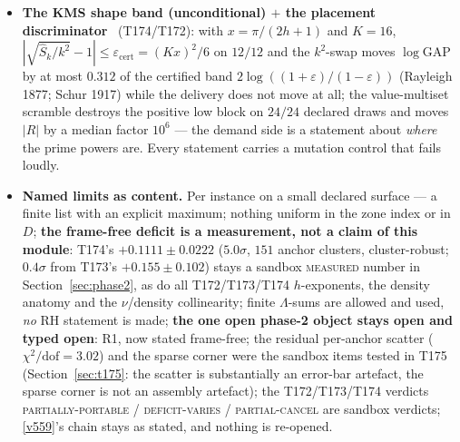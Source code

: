 \documentclass[11pt,a4paper]{article}
\begin{document}
\begin{itemize}[leftmargin=1.5em]
under the full positive diagonal group while a non-scalar diagonal moves the demand by
$0.23$--$1.40$ (the asymmetry is the anatomy); and the additive limit: neither the arch
term nor the comb term alone has a positive definite low block on a single cell ($0/12$
$+$ $0/12$ against $12/12$ for the sum) --- no factorisation $\hat A=(\mathrm{frame})
\times(\mathrm{arithmetic})$ exists, so T173's P6 is \emph{not} promoted to a theorem:
only its multiplicative half is.
\item \textbf{The KMS shape band (unconditional) $+$ the placement discriminator} \mE\
(T174/T172): with $x=\pi/(2h+1)$ and $K=16$,
$|\sqrt{\hat S_k/k^2}-1|\le\varepsilon_{\mathrm{cert}}=(Kx)^2/6$ on $12/12$ and the
$k^2$-swap moves $\log\mathrm{GAP}$ by at most $0.312$ of the certified band
$2\log((1+\varepsilon)/(1-\varepsilon))$ (Rayleigh 1877; Schur 1917) while the delivery
does not move at all; the value-multiset scramble destroys the positive low block on
$24/24$ declared draws and moves $|R|$ by a median factor $10^{6}$ --- the demand side is
a statement about \emph{where} the prime powers are. Every statement carries a mutation
control that fails loudly.
\item \textbf{Named limits as content.} Per instance on a small declared surface --- a
finite list with an explicit maximum; nothing uniform in the zone index or in $D$;
\textbf{the frame-free deficit is a measurement, not a claim of this module}: T174's
$+0.1111\pm0.0222$ ($5.0\sigma$, $151$ anchor clusters, cluster-robust; $0.4\sigma$ from
T173's $+0.155\pm0.102$) stays a sandbox \textsc{measured} number in
Section~\ref{sec:phase2}, as do all T172/T173/T174 $h$-exponents, the density anatomy and
the $\nu$/density collinearity; finite $\Lambda$-sums are allowed and used, \emph{no} RH
statement is made; \textbf{the one open phase-2 object stays open and typed open}: R1,
now stated frame-free; the residual per-anchor scatter ($\chi^2/\mathrm{dof}=3.02$) and
the sparse corner were the sandbox items tested in T175 (Section~\ref{sec:t175}: the
scatter is substantially an error-bar artefact, the sparse corner is not an assembly
artefact); the T172/T173/T174 verdicts
\textsc{partially-portable} / \textsc{deficit-varies} / \textsc{partial-cancel} are
sandbox verdicts; \vref{v559}'s chain stays as stated, and nothing is re-opened.
\end{itemize}
\end{document}

